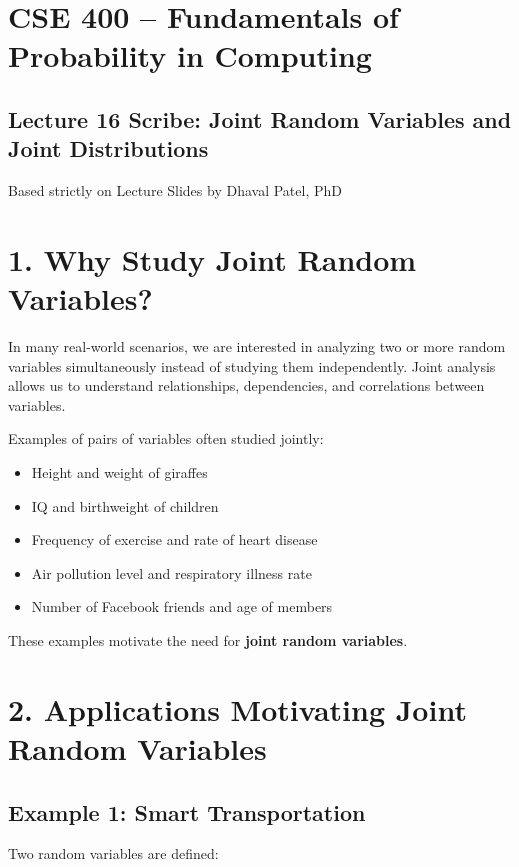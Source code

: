 \documentclass{article}
\begin{document}
\section*{CSE 400 – Fundamentals of Probability in Computing}

\subsection*{Lecture 16 Scribe: Joint Random Variables and Joint Distributions}

Based strictly on Lecture Slides by Dhaval Patel, PhD

\bigskip

\section*{1. Why Study Joint Random Variables?}

In many real-world scenarios, we are interested in analyzing two or more random variables simultaneously instead of studying them independently. Joint analysis allows us to understand relationships, dependencies, and correlations between variables.

Examples of pairs of variables often studied jointly:

\begin{itemize}
\item Height and weight of giraffes
\item IQ and birthweight of children
\item Frequency of exercise and rate of heart disease
\item Air pollution level and respiratory illness rate
\item Number of Facebook friends and age of members
\end{itemize}

These examples motivate the need for \textbf{joint random variables}.

\bigskip

\section*{2. Applications Motivating Joint Random Variables}

\subsection*{Example 1: Smart Transportation}

Two random variables are defined:
\end{document}
